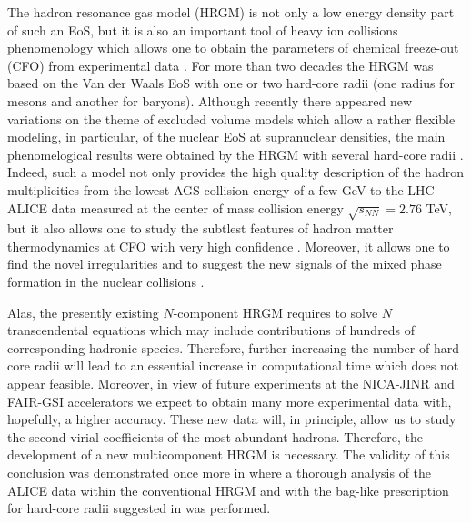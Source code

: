 \documentclass[12pt]{article}
\begin{document}
The hadron resonance gas model (HRGM)  is not only a low energy density part of  such an  EoS, but it is also an important tool of heavy ion collisions  phenomenology  which allows one to obtain  the 
parameters of chemical freeze-out (CFO)   from experimental data \cite{PBM06,Stachel:2013zma}. 
For more than two decades the HRGM was based on the Van der Waals EoS with one or two hard-core radii (one radius for mesons and another for baryons).  
Although recently  there appeared new variations on the theme of excluded volume models \cite{Typel16} which allow a rather flexible modeling, in particular,  of the nuclear EoS at supranuclear densities, the  main phenomelogical results 
were obtained by 
the HRGM with several hard-core radii  \cite{Horn,KABOliinychenko:12,SFO,Veta14,Bugaev:2014,Bugaev:2015,Bugaev:2016,Bugaev:2016ujp}. Indeed,  such a model  not only provides  the  high quality description  of the hadron multiplicities from the lowest AGS collision energy of a few GeV  to 
the LHC ALICE data measured at the center of mass collision energy $\sqrt{s_{NN}} = 2.76$ TeV,  
but it also allows one to study  the  subtlest features  of hadron matter  thermodynamics at CFO  with very high confidence  \cite{Horn,KABOliinychenko:12,SFO,Veta14,Bugaev:2014,Bugaev:2015,Bugaev:2016,Bugaev:2016ujp}.
Moreover, it  allows one  to find  the novel irregularities and to suggest  the new  signals of the mixed phase formation in the nuclear collisions \cite{Bugaev:2014,Bugaev:2015,Bugaev:2016a}. 

Alas, the presently existing $N$-component HRGM requires to solve $N$ transcendental equations which may include contributions of  hundreds  of corresponding hadronic species. Therefore, further increasing the number of hard-core radii will lead to an essential increase in computational time which does not appear feasible. Moreover, in view of  future experiments at the NICA-JINR and FAIR-GSI accelerators we expect to obtain many more experimental data with, hopefully,  a higher accuracy. These new data will, in principle, allow us to study the second virial coefficients of the most abundant hadrons. 
Therefore, the development of a new multicomponent  HRGM is necessary. 
The validity of this conclusion was demonstrated once more  in \cite{Bugaev:2016} where a thorough analysis of the ALICE data within the conventional HRGM and with the bag-like prescription for hard-core radii suggested in \cite{Vovch15} was performed. 
\end{document}
